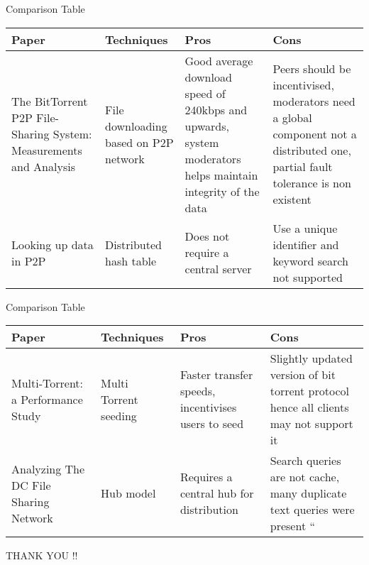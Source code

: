 \documentclass[9pt]{beamer}
\begin{document}
\begin{frame}{Comparison Table}
    \begin{tabularx}{1.0\textwidth} { 
        | >{\centering\arraybackslash}X
        | >{\centering\arraybackslash}X
        | >{\centering\arraybackslash}X
        | >{\centering\arraybackslash}X | }
        \hline Paper & Techniques & Pros & Cons \\
        \hline The BitTorrent P2P File-Sharing System: Measurements and Analysis & File downloading based on P2P network & Good average download speed of 240kbps and upwards, system moderators helps maintain integrity of the data & Peers should be incentivised, moderators need a global component not a distributed one, partial fault tolerance is non existent \\
        \hline Looking up data in P2P & Distributed hash table & Does not require a central server & Use a unique identifier and keyword search not supported \\
        \hline
    \end{tabularx}
\end{frame}

\begin{frame}{Comparison Table}
    \begin{tabularx}{1.0\textwidth} { 
        | >{\centering\arraybackslash}X
        | >{\centering\arraybackslash}X
        | >{\centering\arraybackslash}X
        | >{\centering\arraybackslash}X | }
        \hline Paper & Techniques & Pros & Cons \\
        \hline Multi-Torrent: a Performance Study & Multi Torrent seeding & Faster transfer speeds, incentivises users to seed & Slightly updated version of bit torrent protocol hence all clients may not support it \\
        \hline Analyzing The DC File Sharing Network & Hub model & Requires a central hub for distribution & Search queries are not cache, many duplicate text queries were present ``\\
        \hline
    \end{tabularx}
\end{frame}



\begin{frame}
 \large{ THANK YOU !!}
\end{frame}
\end{document}
